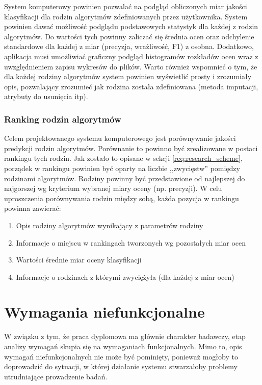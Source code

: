 \documentclass[../thesis.tex]{subfiles}
\begin{document}
System komputerowy powinien pozwalać na podgląd obliczonych miar jakości klasyfikacji dla rodzin algorytmów zdefiniowanych przez użytkownika. System powinien dawać możliwość podglądu podstawowych statystyk dla każdej z rodzin algorytmów. Do wartości tych powinny zaliczać się średnia ocen oraz odchylenie standardowe dla każdej z miar (precyzja, wrażliwość, F1) z osobna. Dodatkowo, aplikacja musi umożliwiać graficzny podgląd histogramów rozkładów ocen wraz z uwzględnieniem zapisu wykresów do plików. Warto również wspomnieć o tym, że dla każdej rodziny algorytmów system powinien wyświetlić prosty i zrozumiały opis, pozwalający zrozumieć jak rodzina została zdefiniowana (metoda imputacji, atrybuty do usunięcia itp).

\subsubsection{Ranking rodzin algorytmów}

Celem projektowanego systemu komputerowego jest porównywanie jakości predykcji rodzin algorytmów. Porównanie to powinno być zrealizowane w postaci rankingu tych rodzin. Jak zostało to opisane w sekcji  \ref{req:research_scheme}, porządek w rankingu powinien być oparty na liczbie ,,zwycięstw'' pomiędzy rodzinami algorytmów. Rodziny powinny być przedstawione od najlepszej do najgorszej wg kryterium wybranej miary oceny (np. precyzji). W celu uproszczenia porównywania rodzin między sobą, każda pozycja w rankingu powinna zawierać:
\begin{enumerate}
  \item Opis rodziny algorytmów wynikający z parametrów rodziny
  \item Informacje o miejscu w rankingach tworzonych wg pozostałych miar ocen
  \item Wartości średnie miar oceny klasyfikacji
  \item Informacje o rodzinach z którymi zwyciężyła (dla każdej z miar ocen)
\end{enumerate}

\section{Wymagania niefunkcjonalne}

W związku z tym, że praca dyplomowa ma głównie charakter badawczy, etap analizy wymagań skupia się na wymaganiach funkcjonalnych. Mimo to, opis wymagań niefunkcjonalnych nie może być pominięty, ponieważ mogłoby to doprowadzić do sytuacji, w której działanie systemu stwarzałoby problemy utrudniające prowadzenie badań.
\end{document}
